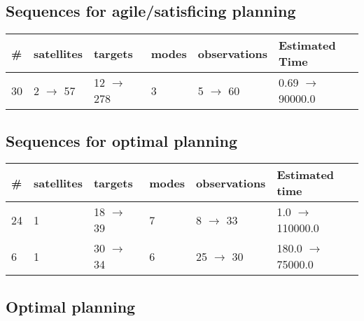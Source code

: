 \documentclass{article}
\begin{document}
                         \subsection*{Sequences for agile/satisficing planning}

                        \begin{center}
                        \begin{tabular}{@{}l|l|l|l|l|l@{}}
                        \# & satellites & targets & modes & observations & Estimated Time\\\midrule
                        30&2 $\rightarrow$ 57&12 $\rightarrow$ 278&3&5 $\rightarrow$ 60&0.69 $\rightarrow$ 90000.0
                        \end{tabular}
                        \end{center}
                    
                            \subsection*{Sequences for optimal planning}

                            \begin{center}
                            \begin{tabular}{@{}l|l|l|l|l|l@{}}
                            \# & satellites & targets & modes & observations & Estimated time\\\midrule
                            24&1&18 $\rightarrow$ 39&7&8 $\rightarrow$ 33&1.0 $\rightarrow$ 110000.0\\
6&1&30 $\rightarrow$ 34&6&25 $\rightarrow$ 30&180.0 $\rightarrow$ 75000.0
                            \end{tabular}
                            \end{center}
                    
                                \subsection*{Optimal planning}
                                
\end{document}

